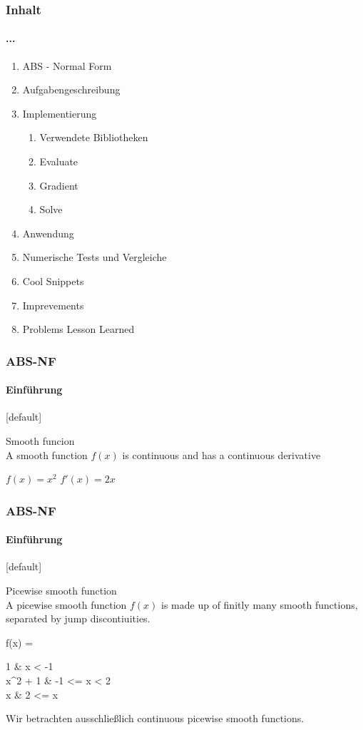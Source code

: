 \begin{frame}
\frametitle{Inhalt}
\framesubtitle{...}
	\begin{enumerate}
		\item ABS - Normal Form
		\item Aufgabengeschreibung
		\item Implementierung
		\begin{enumerate}
			\item Verwendete Bibliotheken
			\item Evaluate
			\item Gradient
			\item Solve
		\end{enumerate}
		\item Anwendung
		\item Numerische Tests und Vergleiche
		\item Cool Snippets
		\item Imprevements
		\item Problems Lesson Learned
	\end{enumerate}
\end{frame}
\begin{frame}
	\frametitle{ABS-NF}
	\framesubtitle{Einführung}
	[default]
	\begin{mydef*}
		Smooth funcion \\
		A smooth function $f(x)$ is continuous and has a continuous derivative
	\end{mydef*}
	$f(x) = x^2$ $f'(x) = 2x$

\end{frame}
\begin{frame}
	\frametitle{ABS-NF}
	\framesubtitle{Einführung}
	[default]
	\begin{mydef*}
		Picewise smooth function \\
		A picewise smooth function $f(x)$ is made up of finitly many smooth functions, separated by
		jump discontiuities.
	\end{mydef*}
	\begin{flalign*}
		f(x) = \begin{cases}
			1 & x < -1 \\
			x^2 + 1 & -1 <= x < 2 \\
			x & 2 <= x
		\end{cases}
	\end{flalign*}
	Wir betrachten ausschließlich continuous picewise smooth functions.
\end{frame}
